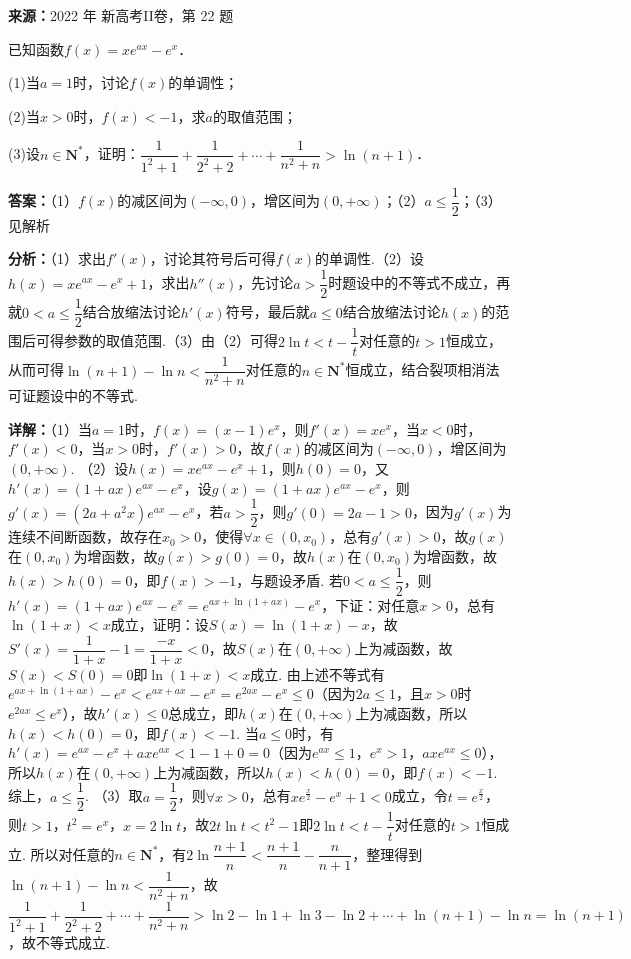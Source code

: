 \begin{question}[points=12]
\textbf{来源：}2022 年 新高考II卷，第 22 题\par
已知函数$f(x)=xe^{ax}-e^x$．

(1)当$a=1$时，讨论$f(x)$的单调性；

(2)当$x>0$时，$f(x)<-1$，求$a$的取值范围；

(3)设$n\in\mathbf{N}^*$，证明：$\dfrac{1}{1^2+1}+\dfrac{1}{2^2+2}+\cdots+\dfrac{1}{n^2+n}>\ln(n+1)$．
\begin{solution}
\textbf{答案：}（1）$f(x)$的减区间为$(-\infty,0)$，增区间为$(0,+\infty)$；（2）$a\leq\dfrac{1}{2}$；（3）见解析

\textbf{分析：}（1）求出$f'(x)$，讨论其符号后可得$f(x)$的单调性.（2）设$h(x)=xe^{ax}-e^x+1$，求出$h''(x)$，先讨论$a>\dfrac{1}{2}$时题设中的不等式不成立，再就$0<a\leq\dfrac{1}{2}$结合放缩法讨论$h'(x)$符号，最后就$a\leq 0$结合放缩法讨论$h(x)$的范围后可得参数的取值范围.（3）由（2）可得$2\ln t<t-\dfrac{1}{t}$对任意的$t>1$恒成立，从而可得$\ln(n+1)-\ln n<\dfrac{1}{n^2+n}$对任意的$n\in\mathbf{N}^*$恒成立，结合裂项相消法可证题设中的不等式.

\textbf{详解：}（1）当$a=1$时，$f(x)=(x-1)e^x$，则$f'(x)=xe^x$，当$x<0$时，$f'(x)<0$，当$x>0$时，$f'(x)>0$，故$f(x)$的减区间为$(-\infty,0)$，增区间为$(0,+\infty)$.
（2）设$h(x)=xe^{ax}-e^x+1$，则$h(0)=0$，又$h'(x)=(1+ax)e^{ax}-e^x$，设$g(x)=(1+ax)e^{ax}-e^x$，则$g'(x)=(2a+a^2x)e^{ax}-e^x$，若$a>\dfrac{1}{2}$，则$g'(0)=2a-1>0$，因为$g'(x)$为连续不间断函数，故存在$x_0>0$，使得$\forall x\in(0,x_0)$，总有$g'(x)>0$，故$g(x)$在$(0,x_0)$为增函数，故$g(x)>g(0)=0$，故$h(x)$在$(0,x_0)$为增函数，故$h(x)>h(0)=0$，即$f(x)>-1$，与题设矛盾. 若$0<a\leq\dfrac{1}{2}$，则$h'(x)=(1+ax)e^{ax}-e^x=e^{ax+\ln(1+ax)}-e^x$，下证：对任意$x>0$，总有$\ln(1+x)<x$成立，证明：设$S(x)=\ln(1+x)-x$，故$S'(x)=\dfrac{1}{1+x}-1=\dfrac{-x}{1+x}<0$，故$S(x)$在$(0,+\infty)$上为减函数，故$S(x)<S(0)=0$即$\ln(1+x)<x$成立. 由上述不等式有$e^{ax+\ln(1+ax)}-e^x<e^{ax+ax}-e^x=e^{2ax}-e^x\leq 0$（因为$2a\leq 1$，且$x>0$时$e^{2ax}\leq e^x$），故$h'(x)\leq 0$总成立，即$h(x)$在$(0,+\infty)$上为减函数，所以$h(x)<h(0)=0$，即$f(x)<-1$. 当$a\leq 0$时，有$h'(x)=e^{ax}-e^x+axe^{ax}<1-1+0=0$（因为$e^{ax}\leq 1$，$e^x>1$，$axe^{ax}\leq 0$），所以$h(x)$在$(0,+\infty)$上为减函数，所以$h(x)<h(0)=0$，即$f(x)<-1$. 综上，$a\leq\dfrac{1}{2}$.
（3）取$a=\dfrac{1}{2}$，则$\forall x>0$，总有$xe^{\frac{x}{2}}-e^x+1<0$成立，令$t=e^{\frac{x}{2}}$，则$t>1$，$t^2=e^x$，$x=2\ln t$，故$2t\ln t<t^2-1$即$2\ln t<t-\dfrac{1}{t}$对任意的$t>1$恒成立. 所以对任意的$n\in\mathbf{N}^*$，有$2\ln\dfrac{n+1}{n}<\dfrac{n+1}{n}-\dfrac{n}{n+1}$，整理得到$\ln(n+1)-\ln n<\dfrac{1}{n^2+n}$，故$\dfrac{1}{1^2+1}+\dfrac{1}{2^2+2}+\cdots+\dfrac{1}{n^2+n}>\ln2-\ln1+\ln3-\ln2+\cdots+\ln(n+1)-\ln n=\ln(n+1)$，故不等式成立.
\end{solution}
\end{question}

